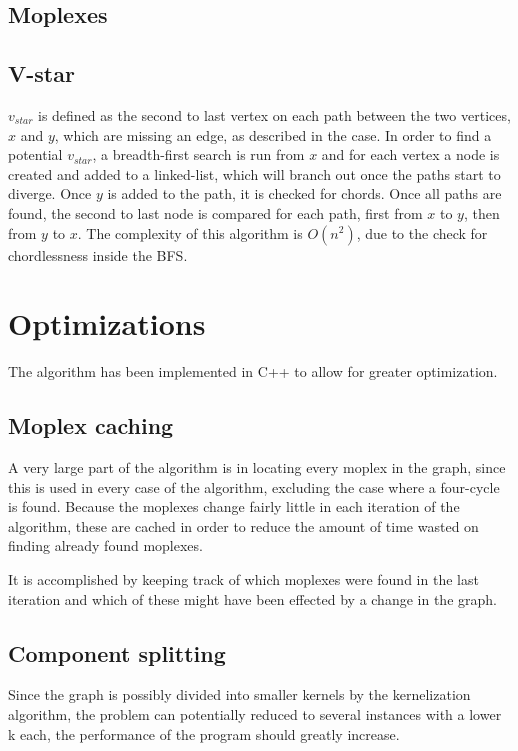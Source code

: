 \documentclass{article}
\begin{document}
		\subsection{Moplexes}

		\subsection{V-star}
		$v_{star}$ is defined as the second to last vertex on each path between the two vertices, $x$ and $y$, which are missing an edge, as described in the case.
		In order to find a potential $v_{star}$, a breadth-first search is run from $x$ and for each vertex a node is created and added to a linked-list, which will branch out once the paths start to diverge.
		Once $y$ is added to the path, it is checked for chords.
		Once all paths are found, the second to last node is compared for each path, first from $x$ to $y$, then from $y$ to $x$.
		The complexity of this algorithm is $O(n^2)$, due to the check for chordlessness inside the BFS.

	\section{Optimizations}
	The algorithm has been implemented in C++ to allow for greater optimization.

		\subsection{Moplex caching}
		A very large part of the algorithm is in locating every moplex in the graph, since this is used in every case of the algorithm, excluding the case where a four-cycle is found.
		Because the moplexes change fairly little in each iteration of the algorithm, these are cached in order to reduce the amount of time wasted on finding already found moplexes.

		It is accomplished by keeping track of which moplexes were found in the last iteration and which of these might have been effected by a change in the graph.

		\subsection{Component splitting}
		Since the graph is possibly divided into smaller kernels by the kernelization algorithm, the problem can potentially reduced to several instances with a lower k each, the performance of the program should greatly increase.
\end{document}

